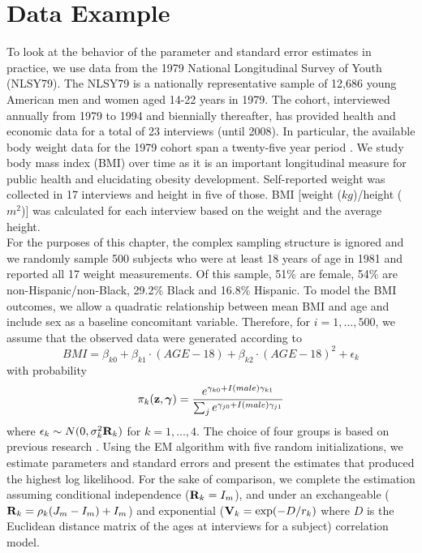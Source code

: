 \section{Data Example}
To look at the behavior of the parameter and standard error estimates in practice, we use data from the 1979 National Longitudinal Survey of Youth (NLSY79). The NLSY79 is a nationally representative sample of 12,686 young American men and women aged 14-22 years in 1979. The cohort, interviewed annually from 1979 to 1994 and biennially thereafter, has provided health and economic data for a total of 23 interviews (until 2008).  In particular, the available body weight data for the 1979 cohort span a twenty-five year period \cite{ostbye2011}. We study body mass index (BMI) over time as it is an important longitudinal measure for public health and elucidating obesity development.  Self-reported weight was collected in 17 interviews and height in five of those. BMI [weight ($kg$)/height ($m^{2}$)] was calculated for each interview based on the weight and the average height.\\

For the purposes of this chapter, the complex sampling structure is ignored and we randomly sample 500 subjects who were at least 18 years of age in 1981 and reported all 17 weight measurements. Of this sample, 51\% are female, 54\% are non-Hispanic/non-Black, 29.2\% Black and 16.8\% Hispanic. To model the BMI outcomes, we allow a quadratic relationship between mean BMI and age and include sex as a baseline concomitant variable. Therefore, for $i=1,...,500$, we assume that the observed data were generated according to
$$BMI=\beta_{k0}+\beta_{k1}\cdot (AGE-18)+\beta_{k2}\cdot (AGE-18)^{2}+\epsilon_{k}$$
with probability
$$\pi_{k}(\mathbf z,\boldsymbol\gamma)=\frac{e^{\gamma_{k0}+I(male)\gamma_{k1}}}{\sum_{j}e^{\gamma_{j0}+I(male)\gamma_{j1}}}$$
where $\epsilon_{k}\sim N(0,\sigma_{k}^{2}\mathbf R_k)$
for $k=1,...,4$. The choice of four groups is based on previous research \cite{ostbye2011}. Using the EM algorithm with five random initializations, we estimate parameters and standard errors and present the estimates that produced the highest log likelihood. For the sake of comparison, we complete the estimation assuming conditional independence ($\mathbf R_k  = I_m$), and under an exchangeable ($\mathbf R_k = \rho_k(J_m - I_m)+I_m$) and exponential ($\mathbf V_k = \exp(-D/r_k)$ where $D$ is the Euclidean distance matrix of the ages at interviews for a subject) correlation model.
